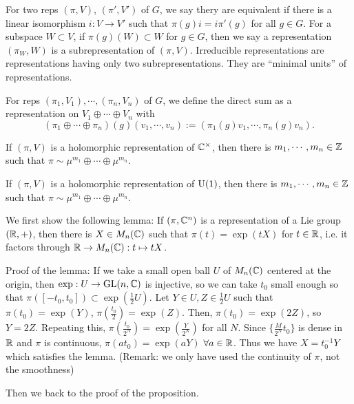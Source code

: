 \documentclass{../../small}
\begin{document}
\begin{defn}
For two reps $(\pi,V)$, $(\pi',V')$ of $G$, we say thery are equivalent if there is a linear isomorphism $i:V\to V'$ such that $\pi(g)i=i\pi'(g)$ for all $g\in G$.
For a subspace $W\subset V$, if $\pi(g)(W)\subset W$ for $g\in G$, then we say a representation $(\pi_W,W)$ is a subrepresentation of $(\pi,V)$.
Irreducible representations are representations having only two subrepresentations.
They are ``minimal units'' of representations.

For reps $(\pi_1,V_1),\cdots,(\pi_n,V_n)$ of $G$, we define the direct sum as a representation on $V_1\oplus\cdots\oplus V_n$ with
\[(\pi_1\oplus\cdots\oplus\pi_n)(g)(v_1,\cdots,v_n):=(\pi_1(g)v_1,\cdots,\pi_n(g)v_n).\]
\end{defn}
\begin{prop}
\begin{parts}
\item If $(\pi,V)$ is a holomorphic representation of $\mathbb{C}^\times$, then there is $m_1,\cdots,m_n\in\mathbb{Z}$ such that $\pi\sim\mu^{m_1}\oplus\cdots\oplus\mu^{m_n}$.
\item If $(\pi,V)$ is a holomorphic representation of $\mathrm{U}(1)$, then there is $m_1,\cdots,m_n\in\mathbb{Z}$ such that $\pi\sim\mu^{m_1}\oplus\cdots\oplus\mu^{m_n}$.
\end{parts}	
\end{prop} 
\begin{pf}
We first show the following lemma: 
If $(\pi,\mathbb{C}^n)$ is a representation of a Lie group $(\mathbb{R},+)$, then there is $X\in M_n(\mathbb{C})$ such that $\pi(t)=\exp(tX)$ for $t\in\mathbb{R}$, i.e. it factors through $\mathbb{R}\to M_n(\mathbb{C}):t\mapsto tX$.

Proof of the lemma:
If we take a small open ball $U$ of $M_n(\mathbb{C})$ centered at the origin, then $\exp:U\to\mathrm{GL}(n,\mathbb{C})$ is injective, so we can take $t_0$ small enough so that $\pi([-t_0,t_0])\subset\exp(\frac12U)$.
Let $Y\in U,Z\in\frac12U$ such that $\pi(t_0)=\exp(Y)$, $\pi(\frac{t_0}2)=\exp(Z)$.
Then, $\pi(t_0)=\exp(2Z)$, so $Y=2Z$.
Repeating this, $\pi(\frac{t_0}{2^N})=\exp(\frac{Y}{2^N})$ for all $N$.
Since $\{\frac{M}{2^N}t_0\}$ is dense in $\mathbb{R}$ and $\pi$ is continuous, $\pi(at_0)=\exp(aY)$ $\forall a\in\mathbb{R}$.
Thus we have $X=t_0^{-1}Y$ which satisfies the lemma.
(Remark: we only have used the continuity of $\pi$, not the smoothness)

Then we back to the proof of the proposition.
\end{pf}
\end{document}
